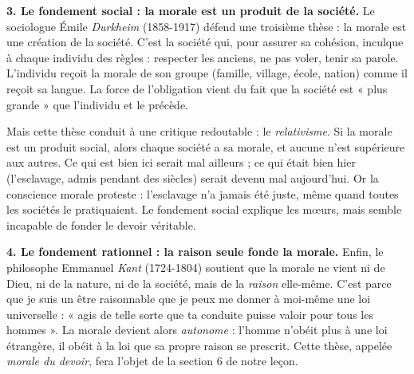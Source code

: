 \documentclass[11pt]{article}
\begin{document}
\textbf{3. Le fondement social : la morale est un produit de la société.} Le sociologue Émile \emph{Durkheim} (1858-1917) défend une troisième thèse : la morale est une création de la société. C'est la société qui, pour assurer sa cohésion, inculque à chaque individu des règles : respecter les anciens, ne pas voler, tenir sa parole. L'individu reçoit la morale de son groupe (famille, village, école, nation) comme il reçoit sa langue. La force de l'obligation vient du fait que la société est « plus grande » que l'individu et le précède.

Mais cette thèse conduit à une critique redoutable : le \emph{relativisme}. Si la morale est un produit social, alors chaque société a sa morale, et aucune n'est supérieure aux autres. Ce qui est bien ici serait mal ailleurs ; ce qui était bien hier (l'esclavage, admis pendant des siècles) serait devenu mal aujourd'hui. Or la conscience morale proteste : l'esclavage n'a jamais été juste, même quand toutes les sociétés le pratiquaient. Le fondement social explique les mœurs, mais semble incapable de fonder le devoir véritable.

\textbf{4. Le fondement rationnel : la raison seule fonde la morale.} Enfin, le philosophe Emmanuel \emph{Kant} (1724-1804) soutient que la morale ne vient ni de Dieu, ni de la nature, ni de la société, mais de la \emph{raison} elle-même. C'est parce que je suis un être raisonnable que je peux me donner à moi-même une loi universelle : « agis de telle sorte que ta conduite puisse valoir pour tous les hommes ». La morale devient alors \emph{autonome} : l'homme n'obéit plus à une loi étrangère, il obéit à la loi que sa propre raison se prescrit. Cette thèse, appelée \emph{morale du devoir}, fera l'objet de la section 6 de notre leçon.
\end{document}
